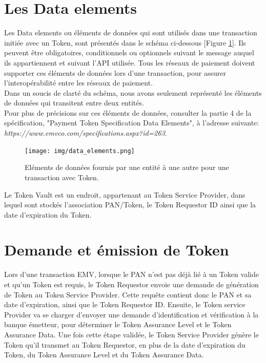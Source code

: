 \documentclass{report}
\begin{document}
\section{Les Data elements}
Les Data elements ou éléments de données qui sont utilisés dans une transaction initiée avec un Token, sont présentés dans le schéma ci-dessous [Figure \ref{DataElements}]. Ils peuvent être obligatoires, conditionnels ou optionnels suivant le message auquel ils appartiennent et suivant l'API utilisée. Tous les réseaux de paiement doivent supporter ces éléments de données lors d'une transaction, pour assurer l'interopérabilité entre les réseaux de paiement.\\

\noindent
Dans un soucis de clarté du schéma, nous avons seulement représenté les éléments de données qui transitent entre deux entités.\\
Pour plus de précisions sur ces éléments de données, consulter la partie 4 de la spécification, "Payment Token Specification Data Elements", à l'adresse suivante: \textit{https://www.emvco.com/specifications.aspx?id=263}.

\begin{figure}[!ht]
    \centering
			\texttt{[image: img/data\_elements.png]}
			\caption{\label{DataElements} Eléments de données fournis par une entité à une autre pour une transaction avec Token.}			
\end{figure}

Le Token Vault est un endroit, appartenant au Token Service Provider, dans lequel sont stockés l'association PAN/Token, le Token Requestor ID ainsi que la date d'expiration du Token.


\section{Demande et émission de Token}
Lors d'une transaction EMV, lorsque le PAN n'est pas déjà lié à un Token valide et qu'un Token est requis, le Token Requestor envoie une demande de génération de Token au Token Service Provider. Cette requête contient donc le PAN et sa date d'expiration, ainsi que le Token Requestor ID. Ensuite, le Token service Provider va se charger d'envoyer une demande d'identification et vérification à la banque émetteur, pour déterminer le Token Assurance Level et le Token Assurance Data. Une fois cette étape validée, le Token Service Provider génère le Token qu'il transmet au Token Requestor, en plus de la date d'expiration du Token, du Token Assurance Level et du Token Assurance Data.\\
\end{document}
